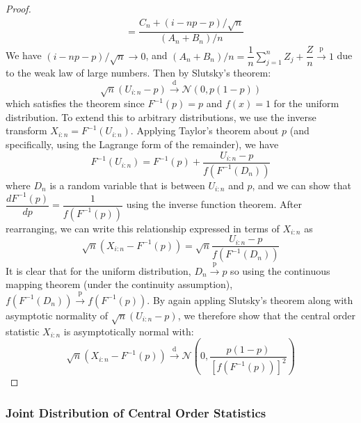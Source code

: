 \documentclass[11pt]{report} %
\begin{document}
\begin{proof}
\begin{align}
&= \dfrac{C_{n} + \left(i - np - p\right)/\sqrt{n}}{\left(A_{n} + B_{n}\right)/n}
\end{align}
We have $\left(i - np - p\right)/\sqrt{n} \to 0$, and $\left(A_{n} + B_{n}\right)/n = \dfrac{1}{n}\sum_{j = 1}^{n}Z_{j} + \dfrac{Z}{n} \overset{\mathrm{p}}{\to} 1$ due to the weak law of large numbers. Then by Slutsky's theorem:
\begin{equation}
\sqrt{n}\left(U_{i:n} - p\right) \overset{\mathrm{d}}{\to} \mathcal{N}\left(0, p\left(1 - p\right)\right)
\end{equation}
which satisfies the theorem since $F^{-1}\left(p\right) = p$ and $f\left(x\right) = 1$ for the uniform distribution. To extend this to arbitrary distributions, we use the inverse transform $X_{i:n} = F^{-1}\left(U_{i:n}\right)$. Applying Taylor's theorem about $p$ (and specifically, using the Lagrange form of the remainder), we have
\begin{equation}
F^{-1}\left(U_{i:n}\right) = F^{-1}\left(p\right) + \dfrac{U_{i:n} - p}{f\left(F^{-1}\left(D_{n}\right)\right)}
\end{equation}
where $D_{n}$ is a random variable that is between $U_{i:n}$ and $p$, and we can show that $\dfrac{dF^{-1}\left(p\right)}{dp} = \dfrac{1}{f\left(F^{-1}\left(p\right)\right)}$ using the inverse function theorem. After rearranging, we can write this relationship expressed in terms of $X_{i:n}$ as
\begin{equation}
\sqrt{n}\left(X_{i:n} - F^{-1}\left(p\right)\right) = \sqrt{n}\dfrac{U_{i:n} - p}{f\left(F^{-1}\left(D_{n}\right)\right)}
\end{equation}
It is clear that for the uniform distribution, $D_{n} \overset{\mathrm{p}}{\to}  p$ so using the continuous mapping theorem (under the continuity assumption), $f\left(F^{-1}\left(D_{n}\right)\right) \overset{\mathrm{p}}{\to} f\left(F^{-1}\left(p\right)\right)$. By again appling Slutsky's theorem along with asymptotic normality of $\sqrt{n}\left(U_{i:n} - p\right)$, we therefore show that the central order statistic $X_{i:n}$ is asymptotically normal with:
\begin{equation}
\sqrt{n}\left(X_{i:n} - F^{-1}\left(p\right)\right) \overset{\mathrm{d}}{\to} \mathcal{N}\left(0, \dfrac{p\left(1 - p\right)}{\left[f\left(F^{-1}\left(p\right)\right)\right]^{2}}\right)
\end{equation}
\end{proof}

\subsubsection{Joint Distribution of Central Order Statistics}
\end{document}
